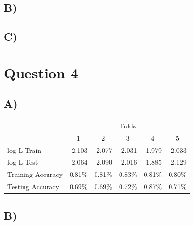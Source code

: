 \documentclass{report}
\begin{document}
\subsection*{B)}
\subsection*{C)}

\section*{Question 4}
\subsection*{A)}
\begin{center}
\begin{table}[h]
 \begin{tabular}{l|c|c|c|c|c|}
 \cline{2-6}
     & \multicolumn{5}{c|}{Folds}      \\ \cline{2-6}
     &  1  &  2  &  3  &  4  &  5 \\ \hline
\multicolumn{1}{|l|}{log L Train} & -2.103 & -2.077 & -2.031 & -1.979 & -2.033  \\ \hline
\multicolumn{1}{|l|}{log L Test} & -2.064 & -2.090 & -2.016 & -1.885 & -2.129  \\ \hline
\multicolumn{1}{|l|}{Training Accuracy} & 0.81\% & 0.81\% & 0.83\% & 0.81\% & 0.80\% \\ \hline
\multicolumn{1}{|l|}{Testing Accuracy} & 0.69\% & 0.69\% & 0.72\% & 0.87\% & 0.71\% \\ \hline
\end{tabular}
\end{table}
\end{center}
\subsection*{B)}
\end{document}
